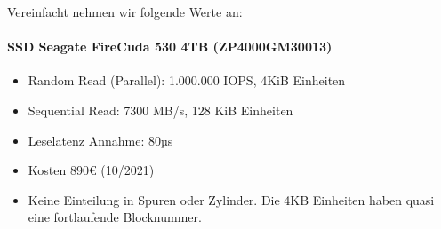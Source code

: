 Vereinfacht nehmen wir folgende Werte an:

\paragraph{SSD Seagate FireCuda 530 4TB (ZP4000GM30013)}
\begin{itemize}
	\item Random Read (Parallel): 1.000.000 IOPS, 4KiB Einheiten
	\item Sequential Read: 7300 MB/s, 128 KiB Einheiten
	\item Leselatenz Annahme: 80µs
	\item Kosten 890€ (10/2021)
	\item Keine Einteilung in Spuren oder Zylinder.
	Die 4KB Einheiten haben quasi eine fortlaufende Blocknummer.
\end{itemize}


